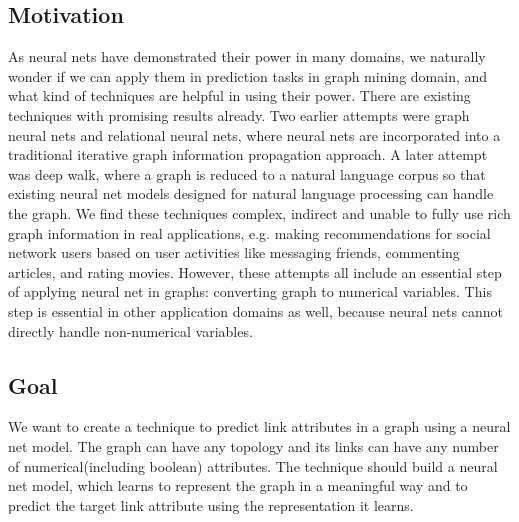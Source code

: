 \documentclass{article}
\begin{document}
\subsection{Motivation}
As neural nets have demonstrated their power in many domains, we naturally 
wonder if we can apply them in prediction tasks in graph mining domain, and 
what kind of techniques are helpful in using their power.
There are existing techniques with promising results already.
Two earlier attempts were graph neural nets and relational neural 
nets\cite{scarselli2009graph}, where neural nets are incorporated into a 
traditional iterative graph information propagation approach.
A later attempt was deep walk\cite{perozzi2014deepwalk}, where a graph is 
reduced to a natural language corpus so that existing neural net models 
designed for natural language processing can handle the graph.
We find these techniques complex, indirect and unable to fully use rich graph 
information in real applications, e.g. making recommendations for social 
network users based on user activities like messaging friends, commenting 
articles, and rating movies.
However, these attempts all include an essential step of applying neural net in 
graphs: converting graph to numerical variables.
This step is essential in other application domains as well, because neural 
nets cannot directly handle non-numerical variables.

\subsection{Goal}
We want to create a technique to predict link attributes in a graph using a 
neural net model. The graph can have any topology and its links can have any 
number of numerical(including boolean) attributes. The technique should build a 
neural net model, which learns to represent the graph in a meaningful way and 
to predict the target link attribute using the representation it learns.
\end{document}
